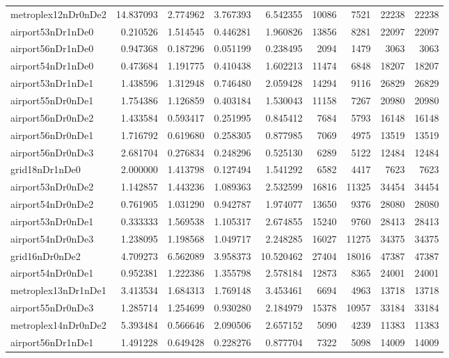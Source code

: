 \begin{longtable}{|l|r|r|r|r|r|r|r|r|}
metroplex12nDr0nDe2 & 14.837093 & 2.774962 & 3.767393 & 6.542355 & 10086 & 7521 & 22238 & 22238 \\
airport53nDr1nDe0 & 0.210526 & 1.514545 & 0.446281 & 1.960826 & 13856 & 8281 & 22097 & 22097 \\
airport56nDr1nDe0 & 0.947368 & 0.187296 & 0.051199 & 0.238495 & 2094 & 1479 & 3063 & 3063 \\
airport54nDr1nDe0 & 0.473684 & 1.191775 & 0.410438 & 1.602213 & 11474 & 6848 & 18207 & 18207 \\
airport53nDr1nDe1 & 1.438596 & 1.312948 & 0.746480 & 2.059428 & 14294 & 9116 & 26829 & 26829 \\
airport55nDr0nDe1 & 1.754386 & 1.126859 & 0.403184 & 1.530043 & 11158 & 7267 & 20980 & 20980 \\
airport56nDr0nDe2 & 1.433584 & 0.593417 & 0.251995 & 0.845412 & 7684 & 5793 & 16148 & 16148 \\
airport56nDr0nDe1 & 1.716792 & 0.619680 & 0.258305 & 0.877985 & 7069 & 4975 & 13519 & 13519 \\
airport56nDr0nDe3 & 2.681704 & 0.276834 & 0.248296 & 0.525130 & 6289 & 5122 & 12484 & 12484 \\
grid18nDr1nDe0 & 2.000000 & 1.413798 & 0.127494 & 1.541292 & 6582 & 4417 & 7623 & 7623 \\
airport53nDr0nDe2 & 1.142857 & 1.443236 & 1.089363 & 2.532599 & 16816 & 11325 & 34454 & 34454 \\
airport54nDr0nDe2 & 0.761905 & 1.031290 & 0.942787 & 1.974077 & 13650 & 9376 & 28080 & 28080 \\
airport53nDr0nDe1 & 0.333333 & 1.569538 & 1.105317 & 2.674855 & 15240 & 9760 & 28413 & 28413 \\
airport54nDr0nDe3 & 1.238095 & 1.198568 & 1.049717 & 2.248285 & 16027 & 11275 & 34375 & 34375 \\
grid16nDr0nDe2 & 4.709273 & 6.562089 & 3.958373 & 10.520462 & 27404 & 18016 & 47387 & 47387 \\
airport54nDr0nDe1 & 0.952381 & 1.222386 & 1.355798 & 2.578184 & 12873 & 8365 & 24001 & 24001 \\
metroplex13nDr1nDe1 & 3.413534 & 1.684313 & 1.769148 & 3.453461 & 6694 & 4963 & 13718 & 13718 \\
airport55nDr0nDe3 & 1.285714 & 1.254699 & 0.930280 & 2.184979 & 15378 & 10957 & 33184 & 33184 \\
metroplex14nDr0nDe2 & 5.393484 & 0.566646 & 2.090506 & 2.657152 & 5090 & 4239 & 11383 & 11383 \\
airport56nDr1nDe1 & 1.491228 & 0.649428 & 0.228276 & 0.877704 & 7322 & 5098 & 14009 & 14009 \\

\end{longtable}
